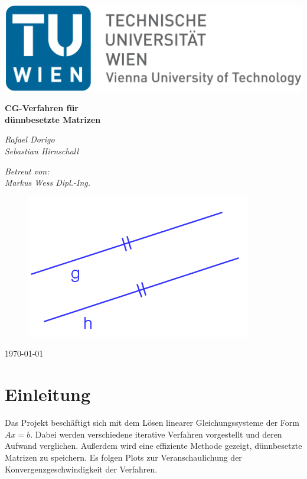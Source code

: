 \documentclass[12pt,a4paper]{scrartcl}
\author{Rafael Dorigo, Sebastian Hirnschall}
\date{\today}
\numberwithin{equation}{section}
\numberwithin{myalgctr}{section}
\numberwithin{mytheoremctr}{subsection}
\numberwithin{mykorollarctr}{subsection}
\numberwithin{mylemmactr}{subsection}
\numberwithin{mybeispielctr}{subsection}
\begin{document}
	\begin{titlepage}
		\begin{flushleft}
				\includegraphics[width=.4\linewidth]{tuwien.png}
		\end{flushleft}	
		\centering
		
		
		\vspace{5cm}
		{\huge\bfseries CG-Verfahren f\"ur \\dünnbesetzte Matrizen\par}
		\vspace{2cm}
		{\Large\itshape Rafael Dorigo\\Sebastian Hirnschall\par}
		\vspace{1cm}
		{\large\itshape Betreut von:\\Markus Wess Dipl.-Ing.\par}
		\vspace{1cm}
		\begin{figure}[!h]
			\vspace{0cm}
			\centering
			\includegraphics[width=.4\linewidth]{titelbild2.png}
		\end{figure}
		
		\vfill
		
		{\today\par}
	\end{titlepage}
	\restoregeometry
	
	\thispagestyle{firststyle}
	
	\newpage\noindent

	\thispagestyle{firststyle}
	
	\newpage
	\tableofcontents
	\thispagestyle{general}
	\newpage

	\section{Einleitung}
	Das Projekt beschäftigt sich mit dem Lösen linearer Gleichungssysteme der Form $Ax = b$. Dabei werden verschiedene iterative Verfahren vorgestellt und deren Aufwand verglichen. Außerdem wird eine effiziente Methode gezeigt, dünnbesetzte Matrizen zu speichern. Es folgen Plots zur Veranschaulichung der Konvergenzgeschwindigkeit der Verfahren.
	\newpage
	
\end{document}
